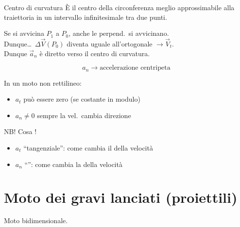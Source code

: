 \documentclass[11pt,a4paper,openany]{report}
\begin{document}
\begin{definizione}{Centro di curvatura}
È il centro della circonferenza meglio approssimabile alla traiettoria in un intervallo
infinitesimale tra due punti.
\end{definizione}

Se si avvicina $P_1$ a $P_0$, anche le perpend.\ si avvicinano.\\
Dunque\dots\ $\Delta\vec{V}(P_0)$ diventa uguale all'ortogonale $\to \vec{V}_t$.\\
Dunque $\vec{a}_n$ è diretto verso il centro di curvatura.

\[
  a_n \to \text{accelerazione centripeta}
\]

In un moto non rettilineo:
\begin{itemize}[nosep]
  \item $a_t$ \implica può essere zero (se costante in modulo)
  \item $a_n \neq 0$ sempre \implica la vel.\ cambia direzione
\end{itemize}

\begin{delucidazione}
NB! Cosa !
\begin{itemize}[nosep]
  \item[\implica] $a_t$ ``tangenziale'': come cambia il  della velocità
  \item[\implica] $a_n$ ``'': come cambia la  della velocità
\end{itemize}
\end{delucidazione}

\chapter{Moto dei gravi lanciati (proiettili)}

Moto bidimensionale.
\end{document}
